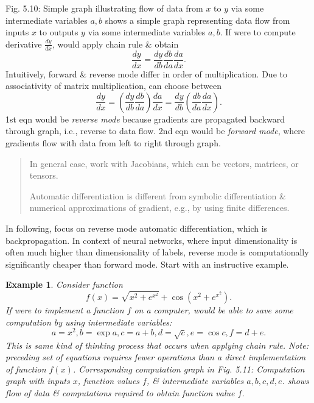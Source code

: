 \documentclass{article}
\newtheorem{example}{Example}
\begin{document}
\begin{enumerate}
\begin{itemize}
\begin{itemize}
\begin{itemize}
				{\sf Fig. 5.10: Simple graph illustrating flow of data from $x$ to $y$ via some intermediate variables $a,b$} shows a simple graph representing data flow from inputs $x$ to outputs $y$ via some intermediate variables $a,b$. If were to compute derivative $\frac{dy}{dx}$, would apply chain rule \& obtain
				\begin{equation}
					\frac{dy}{dx} = \frac{dy}{db}\frac{db}{da}\frac{da}{dx}.
				\end{equation}
				Intuitively, forward \& reverse mode differ in order of multiplication. Due to associativity of matrix multiplication, can choose between
				\begin{equation}
					\frac{dy}{dx} = \left(\frac{dy}{db}\frac{db}{da}\right)\frac{da}{dx} = \frac{dy}{db}\left(\frac{db}{da}\frac{da}{dx}\right).
				\end{equation}
				1st eqn would be {\it reverse mode} because gradients are propagated backward through graph, i.e., reverse to data flow. 2nd eqn would be {\it forward mode}, where gradients flow with data from left to right through graph.
				\begin{quote}
					In general case, work with Jacobians, which can be vectors, matrices, or tensors.
					
					Automatic differentiation is different from symbolic differentiation \& numerical approximations of gradient, e.g., by using finite differences.
				\end{quote}
				In following, focus on reverse mode automatic differentiation, which is backpropagation. In context of neural networks, where input dimensionality is often much higher than dimensionality of labels, reverse mode is computationally significantly cheaper than forward mode. Start with an instructive example.
				\begin{example}
					Consider function
					\begin{equation}
						f(x) = \sqrt{x^2 + e^{x^2}} + \cos\left(x^2 + e^{x^2}\right).
					\end{equation}
					If were to implement a function $f$ on a computer, would be able to save some computation by using {\it intermediate variables}:
					\begin{equation}
						a = x^2,b = \exp a,c = a + b,d = \sqrt{c},e = \cos c,f = d + e.
					\end{equation}
					This is same kind of thinking process that occurs when applying chain rule. Note: preceding set of equations requires fewer operations than a direct implementation of function $f(x)$. Corresponding computation graph in {\sf Fig. 5.11: Computation graph with inputs $x$, function values $f$, \& intermediate variables $a,b,c,d,e$.} shows flow of data \& computations required to obtain function value $f$.
					

\end{example}
\end{itemize}
\end{itemize}
\end{itemize}
\end{enumerate}
\end{document}
